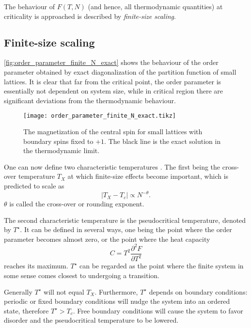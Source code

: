The behaviour of $F(T, N)$ (and hence, all thermodynamic quantities) at criticality is approached is described by
\emph{finite-size scaling}.

\subsection{Finite-size scaling}

\autoref{fig:order_parameter_finite_N_exact} shows the behaviour of the order parameter obtained by exact
diagonalization of the partition function of small lattices.
It is clear that far from the critical point, the order parameter is essentially not dependent on system size,
while in critical region there are significant deviations from the thermodynamic behaviour.

\begin{figure}
  \texttt{[image: order\_parameter\_finite\_N\_exact.tikz]}
  \caption{The magnetization of the central spin for small lattices with boundary spins fixed to
  $+1$. The black line is the exact solution in the thermodynamic limit.}\label{fig:order_parameter_finite_N_exact}
\end{figure}

One can now define two characteristic temperatures \cite{fisher1967interfacial,
barber1983finite}.
The first being the cross-over temperature $T_X$ at which finite-size effects become important,
which is predicted to scale as
\begin{equation}\label{eq:cross_over_temperature_scaling}
  |T_X - T_c| \propto N^{-\theta}.
\end{equation}
$\theta$ is called the cross-over or rounding exponent.

The second characteristic temperature is the pseudocritical temperature,
denoted by $T^{\star}$.
It can be defined in several ways, one being the point where the order parameter becomes almost zero,
or the point where the heat capacity
\begin{equation}
  C = T^2 \frac{\partial^2 F}{\partial T^2}
\end{equation}
reaches its maximum.
$T^{\star}$ can be regarded as the point where the finite system in some sense comes closest to undergoing a transition.

Generally $T^{\star}$ will not equal $T_X$. Furthermore, $T^{\star}$ depends on boundary conditions:
periodic or fixed boundary conditions will nudge the system into an ordered state,
therefore $T^{\star} > T_c$.
Free boundary conditions will cause the system to favor disorder and the pseudocritical temperature to be lowered.

